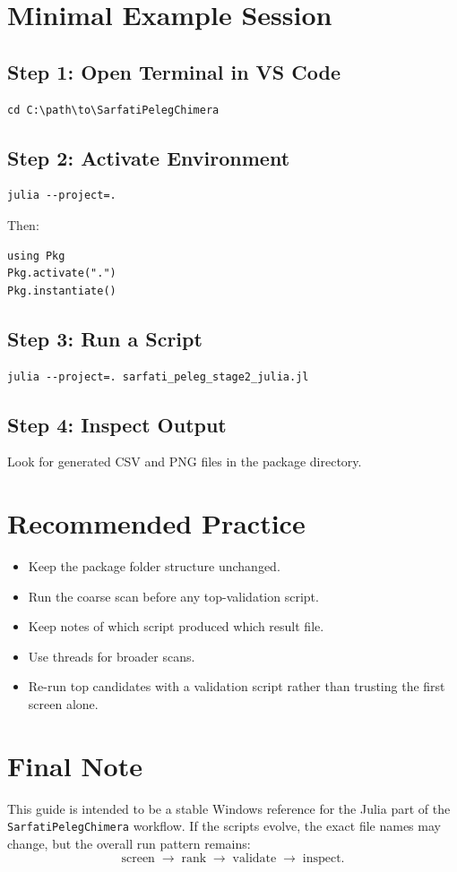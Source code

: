 \documentclass[11pt,a4paper]{article}
\begin{document}
\section{Minimal Example Session}
\subsection{Step 1: Open Terminal in VS Code}
\begin{lstlisting}[style=wincli]
cd C:\path\to\SarfatiPelegChimera
\end{lstlisting}

\subsection{Step 2: Activate Environment}
\begin{lstlisting}[style=wincli]
julia --project=.
\end{lstlisting}

Then:
\begin{lstlisting}[style=wincli]
using Pkg
Pkg.activate(".")
Pkg.instantiate()
\end{lstlisting}

\subsection{Step 3: Run a Script}
\begin{lstlisting}[style=wincli]
julia --project=. sarfati_peleg_stage2_julia.jl
\end{lstlisting}

\subsection{Step 4: Inspect Output}
Look for generated CSV and PNG files in the package directory.

\section{Recommended Practice}
\begin{itemize}[leftmargin=1.5em]
    \item Keep the package folder structure unchanged.
    \item Run the coarse scan before any top-validation script.
    \item Keep notes of which script produced which result file.
    \item Use threads for broader scans.
    \item Re-run top candidates with a validation script rather than trusting the first screen alone.
\end{itemize}

\section{Final Note}
This guide is intended to be a stable Windows reference for the Julia part of the
\texttt{SarfatiPelegChimera} workflow. If the scripts evolve, the exact file names
may change, but the overall run pattern remains:
\[
\text{screen} \;\to\; \text{rank} \;\to\; \text{validate} \;\to\; \text{inspect}.
\]
\end{document}
